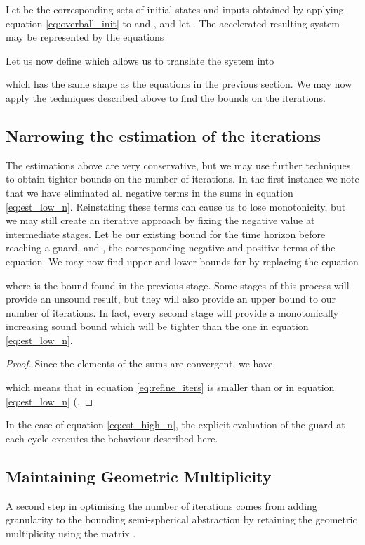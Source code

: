 \documentclass{IEEEtran}
\newcommand{\rronly}[1]{{#1}}
\begin{document}
Let  be the corresponding sets of initial states and inputs obtained by applying equation \eqref{eq:overball_init} to  and , and let . The accelerated resulting system may be represented by the equations

Let us now define  which allows us to translate the system into

which has the same shape as the equations in the previous section. We may now apply the techniques described above to find the bounds on the iterations.

\rronly{
\subsection{Narrowing the estimation of the iterations} \label{sec:guards_tight}
The estimations above are very conservative, but we may use further techniques to obtain tighter bounds on the number of iterations.
In the first instance we note that we have eliminated all negative terms in the sums in equation \eqref{eq:est_low_n}. Reinstating these terms can cause us to lose monotonicity, but we may still create an iterative approach by fixing the negative value at intermediate stages.
Let  be our existing bound for the time horizon before reaching a guard, and ,   the corresponding negative and positive terms of the equation.
We may now find upper and lower bounds for  by replacing the equation 

where  is the bound found in the previous stage. Some stages of this process will provide an unsound result, but they will also provide an upper bound to our number of iterations. 
In fact, every second stage will provide a monotonically increasing sound bound which will be tighter than the one in equation \eqref{eq:est_low_n}.
\begin{proof}
Since the elements of the sums are convergent, we have

which means that  in equation \eqref{eq:refine_iters} is smaller than or  in equation \eqref{eq:est_low_n} (.
\end{proof}

In the case of equation \eqref{eq:est_high_n}, the explicit evaluation of the guard at each cycle executes the behaviour described here.
}
\subsection{Maintaining Geometric Multiplicity} \label{sec:guards_geometric}
A second step in optimising the number of iterations comes from adding granularity to the bounding semi-spherical abstraction by retaining the geometric multiplicity using the matrix .
\end{document}
